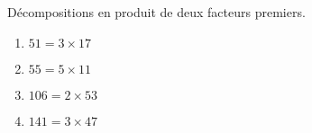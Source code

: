     Décompositions en produit de deux facteurs premiers.

    \begin{enumerate}
        \item $51=3\times 17$
        \item $55=5\times 11$
        \item $106=2\times 53$
        \item $141=3\times 47$
    \end{enumerate}
